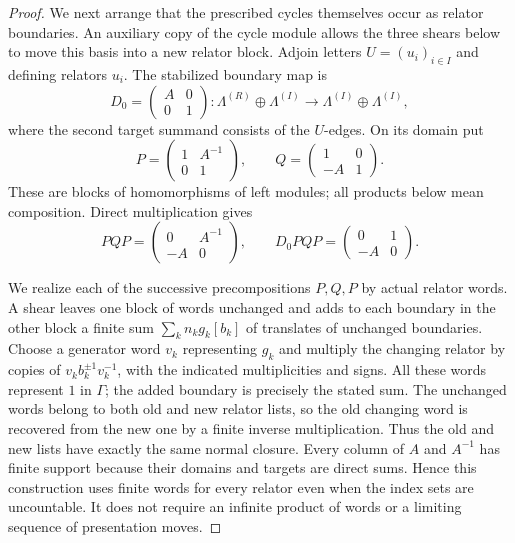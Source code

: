 \begin{proof}
We next arrange that the prescribed cycles themselves occur as relator
boundaries. An auxiliary copy of the cycle module allows the three
shears below to move this basis into a new relator block.
Adjoin letters $U=(u_i)_{i\in I}$ and defining relators $u_i$.
The stabilized boundary map is
\[
 D_0=\begin{pmatrix}A&0\\0&1\end{pmatrix}:
 \Lambda^{(R)}\oplus\Lambda^{(I)}
 \longrightarrow\Lambda^{(I)}\oplus\Lambda^{(I)},
\]
where the second target summand consists of the $U$-edges.  On its
domain put
\[
 P=\begin{pmatrix}1&A^{-1}\\0&1\end{pmatrix},
 \qquad Q=\begin{pmatrix}1&0\\-A&1\end{pmatrix}.
\]
These are blocks of homomorphisms of left modules; all products below
mean composition.  Direct multiplication gives
\begin{equation}\label{eq:presentation-shears}
 PQP=\begin{pmatrix}0&A^{-1}\\-A&0\end{pmatrix},
 \qquad
 D_0PQP=\begin{pmatrix}0&1\\-A&0\end{pmatrix}.
\end{equation}

We realize each of the successive precompositions $P,Q,P$ by actual
relator words.  A shear leaves one block of words unchanged and adds to
each boundary in the other block a finite sum
$\sum_k n_k g_k[b_k]$ of translates of unchanged boundaries.
Choose a generator word $v_k$ representing $g_k$ and multiply the
changing relator by copies of $v_k b_k^{\pm1}v_k^{-1}$, with the indicated
multiplicities and signs.  All these words represent $1$ in $\Gamma$;
the added boundary is precisely the stated sum.  The unchanged words
belong to both old and new relator lists, so the old changing word is
recovered from the new one by a finite inverse multiplication.  Thus
the old and new lists have exactly the same normal closure.
Every column of $A$ and $A^{-1}$ has finite support because their domains
and targets are direct sums.  Hence this construction uses finite words
for every relator even when the index sets are uncountable.  It does
not require an infinite product of words or a limiting sequence of
presentation moves.


\end{proof}
